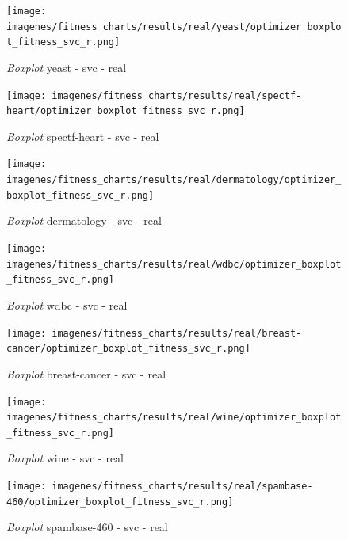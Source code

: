 \begin{figure}[htp]
    \centering
    \texttt{[image: imagenes/fitness\_charts/results/real/yeast/optimizer\_boxplot\_fitness\_svc\_r.png]}
    \caption{\textit{Boxplot} yeast - svc - real}

\end{figure}

\begin{figure}[htp]
    \centering
    \texttt{[image: imagenes/fitness\_charts/results/real/spectf-heart/optimizer\_boxplot\_fitness\_svc\_r.png]}
    \caption{\textit{Boxplot} spectf-heart - svc - real}

\end{figure}

\begin{figure}[htp]
    \centering
    \texttt{[image: imagenes/fitness\_charts/results/real/dermatology/optimizer\_boxplot\_fitness\_svc\_r.png]}
    \caption{\textit{Boxplot} dermatology - svc - real}

\end{figure}

\begin{figure}[htp]
    \centering
    \texttt{[image: imagenes/fitness\_charts/results/real/wdbc/optimizer\_boxplot\_fitness\_svc\_r.png]}
    \caption{\textit{Boxplot} wdbc - svc - real}

\end{figure}

\begin{figure}[htp]
    \centering
    \texttt{[image: imagenes/fitness\_charts/results/real/breast-cancer/optimizer\_boxplot\_fitness\_svc\_r.png]}
    \caption{\textit{Boxplot} breast-cancer - svc - real}

\end{figure}

\begin{figure}[htp]
    \centering
    \texttt{[image: imagenes/fitness\_charts/results/real/wine/optimizer\_boxplot\_fitness\_svc\_r.png]}
    \caption{\textit{Boxplot} wine - svc - real}

\end{figure}

\begin{figure}[htp]
    \centering
    \texttt{[image: imagenes/fitness\_charts/results/real/spambase-460/optimizer\_boxplot\_fitness\_svc\_r.png]}
    \caption{\textit{Boxplot} spambase-460 - svc - real}

\end{figure}

